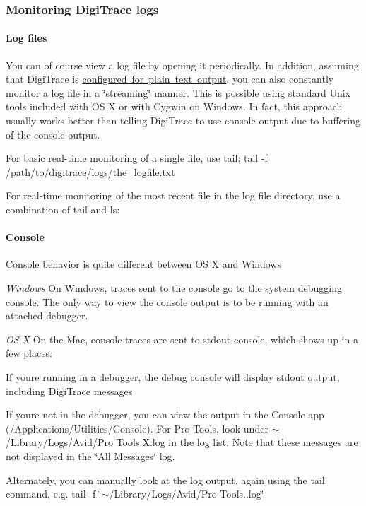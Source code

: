 \hypertarget{a00834_digitrace__logfiles__monitoring}{}\subsubsection{Monitoring Digi\+Trace logs}\label{a00834_digitrace__logfiles__monitoring}
\hypertarget{a00834_digitrace__logfiles__monitoring__files}{}\paragraph{Log files}\label{a00834_digitrace__logfiles__monitoring__files}
 You can of course view a log file by opening it periodically. In addition, assuming that Digi\+Trace is \mbox{\hyperlink{a00834_digitrace__gettingstarted__configurefordevelopment}{configured for plain text output}}, you can also constantly monitor a log file in a \char`\"{}streaming\char`\"{} manner. This is possible using standard Unix tools included with OS X or with Cygwin on Windows. In fact, this approach usually works better than telling Digi\+Trace to use console output due to buffering of the console output.

 
\begin{DoxyItemize}
\item For basic real-\/time monitoring of a single file, use {\ttfamily tail}\+: {\ttfamily tail -\/f /path/to/digitrace/logs/the\+\_\+logfile.txt }  
\item For real-\/time monitoring of the most recent file in the log file directory, use a combination of {\ttfamily tail} and {\ttfamily ls}\+:   
\end{DoxyItemize}

\hypertarget{a00834_digitrace__logfiles__monitoring__console}{}\paragraph{Console}\label{a00834_digitrace__logfiles__monitoring__console}
 Console behavior is quite different between OS X and Windows

 {\itshape Windows } On Windows, traces sent to the console go to the system debugging console. The only way to view the console output is to be running with an attached debugger. 

 {\itshape OS X } On the Mac, console traces are sent to stdout console, which shows up in a few places\+: 
\begin{DoxyItemize}
\item If you\textquotesingle{}re running in a debugger, the debug console will display stdout output, including Digi\+Trace messages  
\item If you\textquotesingle{}re not in the debugger, you can view the output in the Console app (/\+Applications/\+Utilities/\+Console). For Pro Tools, look under $\sim$/\+Library/\+Logs/\+Avid/\+Pro Tools.\+X.\+log in the log list. Note that these messages are not displayed in the \char`\"{}\+All Messages\char`\"{} log.  
\item Alternately, you can manually look at the log output, again using the {\ttfamily tail} command, e.\+g. {\ttfamily tail -\/f \char`\"{}$\sim$/\+Library/\+Logs/\+Avid/\+Pro Tools..\+log\char`\"{}}  
\end{DoxyItemize}

